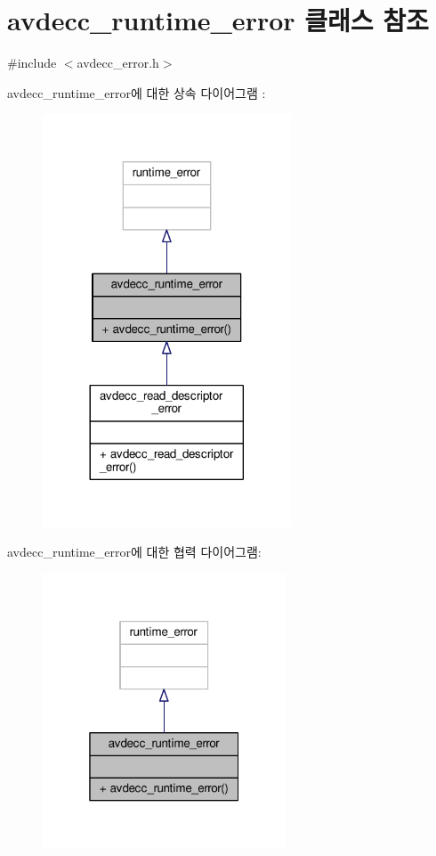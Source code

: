\hypertarget{classavdecc__lib_1_1avdecc__runtime__error}{}\section{avdecc\+\_\+runtime\+\_\+error 클래스 참조}
\label{classavdecc__lib_1_1avdecc__runtime__error}


{\ttfamily \#include $<$avdecc\+\_\+error.\+h$>$}



avdecc\+\_\+runtime\+\_\+error에 대한 상속 다이어그램 \+: 
\nopagebreak
\begin{figure}[H]
\begin{center}
\leavevmode
\includegraphics[width=209pt]{classavdecc__lib_1_1avdecc__runtime__error__inherit__graph}
\end{center}
\end{figure}


avdecc\+\_\+runtime\+\_\+error에 대한 협력 다이어그램\+:
\nopagebreak
\begin{figure}[H]
\begin{center}
\leavevmode
\includegraphics[width=205pt]{classavdecc__lib_1_1avdecc__runtime__error__coll__graph}
\end{center}
\end{figure}
